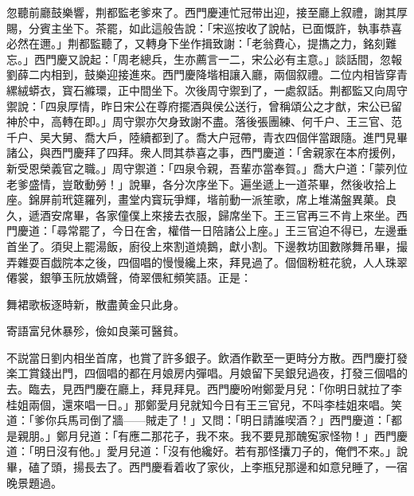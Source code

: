 忽聽前廳鼓樂響，荆都監老爹來了。西門慶連忙冠带出迎，接至廳上叙禮，謝其厚賜，分賓主坐下。茶罷，如此這般告說：「宋巡按收了說帖，已面慨許，執事恭喜必然在邇。」荆都監聽了，又轉身下坐作揖致謝：「老翁費心，提㩦之力，銘刻難忘。」西門慶又說起：「周老總兵，生亦薦言一二，宋公必有主意。」談話間，忽報劉薛二内相到，鼓樂迎接進來。西門慶降堦相讓入廳，兩個叙禮。二位内相皆穿青縲絨蟒衣，寳石縧環，正中間坐下。次後周守禦到了，一處叙話。荆都監又向周守禦說：「四泉厚情，昨日宋公在尊府擺酒與侯公送行，曾稱頌公之才猷，宋公已留神於中，高轉在即。」周守禦亦欠身致謝不盡。落後張團練、何千户、王三官、范千户、吴大舅、喬大戶，陸續都到了。喬大户冠帶，青衣四個伴當跟隨。進門見畢諸公，與西門慶拜了四拜。衆人問其恭喜之事，西門慶道：「舍親家在本府援例，新受恩榮義官之職。」周守禦道：「四泉令親，吾輩亦當奉賀。」喬大户道：「蒙列位老爹盛情，豈敢動勞！」說畢，各分次序坐下。遍坐遞上一道茶畢，然後收拾上座。錦屏前玳筵羅列，畫堂内寳玩爭輝，堦前動一派笙歌，席上堆滿盤異菓。良久，遞酒安席畢，各家僮僕上來接去衣服，歸席坐下。王三官再三不肯上來坐。西門慶道：「尋常罷了，今日在舍，權借一日陪諸公上座。」王三官迫不得已，左邊垂首坐了。須臾上罷湯飯，廚役上來割道燒鵝，獻小割。下邊教坊囬數隊舞吊畢，撮弄雜耍百戯院本之後，四個唱的慢慢纔上來，拜見過了。個個粉粧花貌，人人珠翠僊裳，銀箏玉阮放嬌聲，倚翠偎紅頻笑語。正是：

\begin{myquote}
舞裙歌板逐時新，散盡黄金只此身。

寄語富兒休暴殄，儉如良薬可醫貧。
\end{myquote}

不説當日劉内相坐首席，也賞了許多銀子。飲酒作歡至一更時分方散。西門慶打發楽工賞錢出門，四個唱的都在月娘房内彈唱。月娘留下吴銀兒過夜，打發三個唱的去。臨去，見西門慶在廳上，拜見拜見。西門慶吩咐鄭愛月兒：「你明日就拉了李桂姐兩個，還來唱一日。」那鄭愛月兒就知今日有王三官兒，不呌李桂姐來唱。笑道：「爹你兵馬司倒了牆——賊走了！」又問：「明日請誰喫酒？」西門慶道：「都是親朋。」鄭月兒道：「有應二那花子，我不來。我不要見那醜寃家怪物！」西門慶道：「明日沒有他。」愛月兒道：「沒有他纔好。若有那怪攮刀子的，俺們不來。」說畢，磕了頭，揚長去了。西門慶看着收了家伙，上李瓶兒那邊和如意兒睡了，一宿晚景題過。

